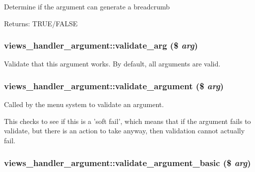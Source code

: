 \label{classviews__handler__argument_a22155030bf440ff07a323569f80fd98}


Determine if the argument can generate a breadcrumb

\begin{Desc}
\item[Returns:]TRUE/FALSE \end{Desc}
\hypertarget{classviews__handler__argument_7073b6fd3db280e88bd09d2517a9d767}{
\subsubsection[{validate\_\-arg}]{\setlength{\rightskip}{0pt plus 5cm}views\_\-handler\_\-argument::validate\_\-arg (\$ {\em arg})}}
\label{classviews__handler__argument_7073b6fd3db280e88bd09d2517a9d767}


Validate that this argument works. By default, all arguments are valid. \hypertarget{classviews__handler__argument_ae090e0aaeabc60dfe06a0c892cabe36}{
\subsubsection[{validate\_\-argument}]{\setlength{\rightskip}{0pt plus 5cm}views\_\-handler\_\-argument::validate\_\-argument (\$ {\em arg})}}
\label{classviews__handler__argument_ae090e0aaeabc60dfe06a0c892cabe36}


Called by the menu system to validate an argument.

This checks to see if this is a 'soft fail', which means that if the argument fails to validate, but there is an action to take anyway, then validation cannot actually fail. \hypertarget{classviews__handler__argument_b2ca8b443e4b53e1ca532faf0f4565f5}{
\subsubsection[{validate\_\-argument\_\-basic}]{\setlength{\rightskip}{0pt plus 5cm}views\_\-handler\_\-argument::validate\_\-argument\_\-basic (\$ {\em arg})}}
\label{classviews__handler__argument_b2ca8b443e4b53e1ca532faf0f4565f5}


